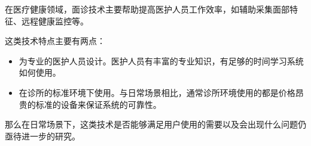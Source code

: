 
在医疗健康领域，面诊技术主要帮助提高医护人员工作效率，如辅助采集面部特征\cite{张红凯2015中医面诊信息采集与识别方法研究进展}、远程健康监控\cite{Hossain2015Cloud}等。



这类技术特点主要有两点：
\begin{itemize}
    \item 为专业的医护人员设计。医护人员有丰富的专业知识，有足够的时间学习系统如何使用。
    
    \item 在诊所的标准环境下使用。与日常场景相比，通常诊所环境使用的都是价格昂贵的标准的设备来保证系统的可靠性。

\end{itemize}

那么在日常场景下，这类技术是否能够满足用户使用的需要以及会出现什么问题仍亟待进一步的研究。




